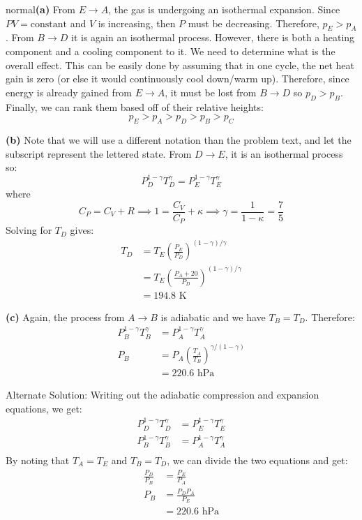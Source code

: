 \begin{solution}{normal}\textbf{(a)} From $E\to A$, the gas is undergoing an isothermal expansion. Since $PV=\text{constant}$ and $V$ is increasing, then $P$ must be decreasing. Therefore, $p_E>p_A$. From $B \to D$ it is again an isothermal process. However, there is both a heating component and a cooling component to it. We need to determine what is the overall effect. This can be easily done by assuming that in one cycle, the net heat gain is zero (or else it would continuously cool down/warm up). Therefore, since energy is already gained from $E\to A$, it must be lost from $B \to D$ so $p_D>p_B$. Finally, we can rank them based off of their relative heights:
$$p_E>p_A>p_D>p_B>p_C$$
\vspace{3mm}

\noindent \textbf{(b)} Note that we will use a different notation than the problem text, and let the subscript represent the lettered state. From $D \to E$, it is an isothermal process so:
$$P_D^{1-\gamma}T_D^\gamma = P_E^{1-\gamma}T_E^\gamma$$
where
$$C_P = C_V + R \implies 1 = \frac{C_V}{C_P}+\kappa \implies \gamma = \frac{1}{1-\kappa} = \frac{7}{5}$$
Solving for $T_D$ gives:
\begin{align*}
T_D &= T_E \left(\frac{P_E}{P_D}\right)^{(1-\gamma)/\gamma}\\&=T_E \left(\frac{P_A+20}{P_D}\right)^{(1-\gamma)/\gamma}\\&=194.8 \text{ K}
\end{align*}
\vspace{3mm}

\noindent \textbf{(c)} Again, the process from $A \to B$ is adiabatic and we have $T_B=T_D$. Therefore:
\begin{align*}
P_B^{1-\gamma}T_B^\gamma &= P_A^{1-\gamma}T_A^\gamma \\
P_B &= P_A\left(\frac{T_A}{T_B}\right)^{\gamma/(1-\gamma)} \\
&= 220.6 \text{ hPa}
\end{align*}
\vspace{3mm}

\noindent Alternate Solution: Writing out the adiabatic compression and expansion equations, we get:
\begin{align*}
P_D^{1-\gamma}T_D^\gamma &= P_E^{1-\gamma}T_E^\gamma \\
P_B^{1-\gamma}T_B^\gamma &= P_A^{1-\gamma}T_A^\gamma \\
\end{align*}
By noting that $T_A=T_E$ and $T_B=T_D$, we can divide the two equations and get:
\begin{align*}
\frac{P_D}{P_B} &= \frac{P_E}{P_A} \\
P_B &= \frac{P_DP_A}{P_E} \\
&= 220.6 \text{ hPa}
\end{align*}
\vspace{3mm}


\end{solution}
